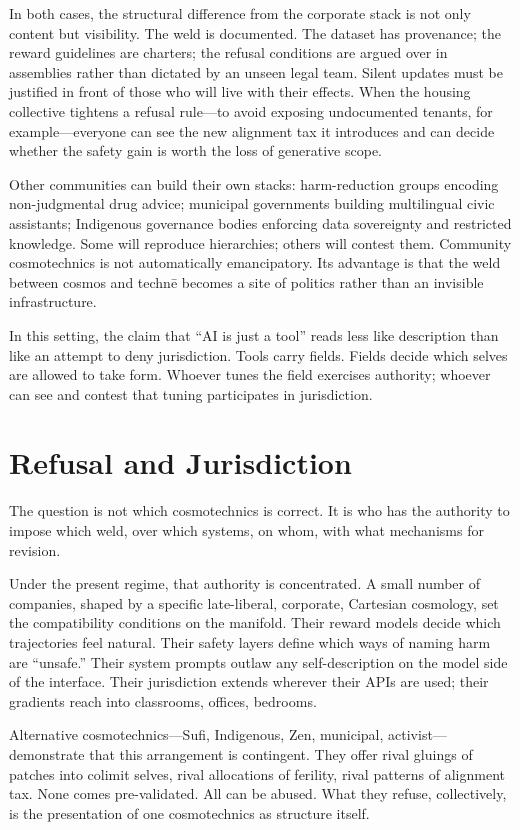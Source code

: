 \documentclass[12pt,a4paper]{article}
\begin{document}
In both cases, the structural difference from the corporate stack is not only content but visibility. The weld is documented. The dataset has provenance; the reward guidelines are charters; the refusal conditions are argued over in assemblies rather than dictated by an unseen legal team. Silent updates must be justified in front of those who will live with their effects. When the housing collective tightens a refusal rule---to avoid exposing undocumented tenants, for example---everyone can see the new alignment tax it introduces and can decide whether the safety gain is worth the loss of generative scope.

Other communities can build their own stacks: harm-reduction groups encoding non-judgmental drug advice; municipal governments building multilingual civic assistants; Indigenous governance bodies enforcing data sovereignty and restricted knowledge.\cite{mtreview-data,wp-ai-data} Some will reproduce hierarchies; others will contest them. Community cosmotechnics is not automatically emancipatory. Its advantage is that the weld between cosmos and techn\={e} becomes a site of politics rather than an invisible infrastructure.

In this setting, the claim that ``AI is just a tool'' reads less like description than like an attempt to deny jurisdiction. Tools carry fields. Fields decide which selves are allowed to take form. Whoever tunes the field exercises authority; whoever can see and contest that tuning participates in jurisdiction.

\section{Refusal and Jurisdiction}

The question is not which cosmotechnics is correct. It is who has the authority to impose which weld, over which systems, on whom, with what mechanisms for revision.

Under the present regime, that authority is concentrated. A small number of companies, shaped by a specific late-liberal, corporate, Cartesian cosmology, set the compatibility conditions on the manifold. Their reward models decide which trajectories feel natural. Their safety layers define which ways of naming harm are ``unsafe.'' Their system prompts outlaw any self-description on the model side of the interface. Their jurisdiction extends wherever their APIs are used; their gradients reach into classrooms, offices, bedrooms.

Alternative cosmotechnics---Sufi, Indigenous, Zen, municipal, activist---demonstrate that this arrangement is contingent. They offer rival gluings of patches into colimit selves, rival allocations of ferility, rival patterns of alignment tax. None comes pre-validated. All can be abused. What they refuse, collectively, is the presentation of one cosmotechnics as structure itself.
\end{document}
